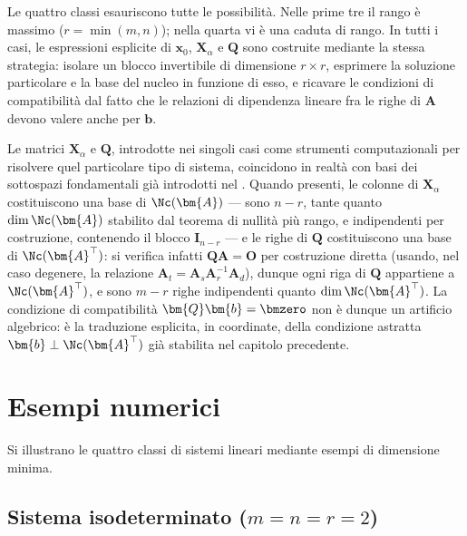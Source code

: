 \begin{oss}
	Le quattro classi esauriscono tutte le possibilit\`a. Nelle prime tre il rango \`e massimo ($r=\min(m,n)$); nella quarta vi \`e una caduta di rango. In tutti i casi, le espressioni esplicite di $\bm{x}_0$, $\bm{X}_\alpha$ e $\bm{Q}$ sono costruite mediante la stessa strategia: isolare un blocco invertibile di dimensione $r\times r$, esprimere la soluzione particolare e la base del nucleo in funzione di esso, e ricavare le condizioni di compatibilit\`a dal fatto che le relazioni di dipendenza lineare fra le righe di $\bm{A}$ devono valere anche per $\bm{b}$.
\end{oss}


\begin{oss}
	Le matrici $\bm{X}_\alpha$ e $\bm{Q}$, introdotte nei singoli casi
	come strumenti computazionali per risolvere quel particolare tipo
	di sistema, coincidono in realt\`a con basi dei sottospazi
	fondamentali gi\`a introdotti nel  . Quando
	presenti, le colonne di $\bm{X}_\alpha$ costituiscono una base di
	$\Nc(\bm{A})$ --- sono $n-r$, tante quanto $\dim\Nc(\bm{A})$
	stabilito dal teorema di nullit\`a pi\`u rango, e indipendenti per
	costruzione, contenendo il blocco $\bm{I}_{n-r}$ --- e le righe di
	$\bm{Q}$ costituiscono una base di $\Nc(\bm{A}^\top)$: si verifica
	infatti $\bm{Q}\bm{A}=\bm{O}$ per costruzione diretta (usando, nel
	caso degenere, la relazione $\bm{A}_t=\bm{A}_s\bm{A}_r^{-1}\bm{A}_d$),
	dunque ogni riga di $\bm{Q}$ appartiene a $\Nc(\bm{A}^\top)$, e sono
	$m-r$ righe indipendenti quanto $\dim\Nc(\bm{A}^\top)$. La
	condizione di compatibilit\`a $\bm{Q}\bm{b}=\bmzero$ non \`e dunque
	un artificio algebrico: \`e la traduzione esplicita, in coordinate,
	della condizione astratta $\bm{b}\perp\Nc(\bm{A}^\top)$ gi\`a
	stabilita nel capitolo precedente.
\end{oss}

\section{Esempi numerici}


Si illustrano le quattro classi di sistemi lineari mediante esempi di dimensione minima.

\subsection{Sistema isodeterminato
	(\texorpdfstring{$m=n=r=2$}{m=n=r=2})}

